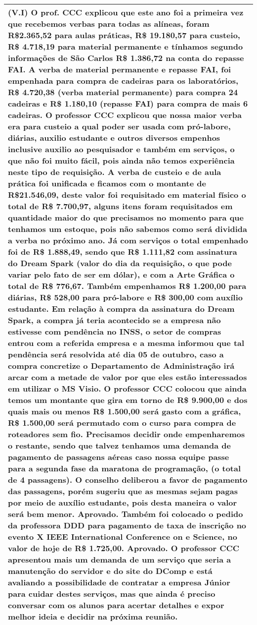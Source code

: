 \begin{longtable}{|p{17.5cm}|}
 \\ \hline 
(V.I) O prof. CCC explicou que este ano foi a primeira vez que recebemos verbas para todas as alíneas, foram R\$2.365,52 para aulas práticas, R\$ 19.180,57 para custeio, R\$ 4.718,19 para material permanente e tínhamos segundo informações de São Carlos R\$ 1.386,72 na conta do repasse FAI. A verba de material permanente e repasse FAI, foi empenhada para compra de cadeiras para os laboratórios, R\$ 4.720,38 (verba material permanente) para compra 24 cadeiras e R\$ 1.180,10 (repasse FAI) para compra de mais 6 cadeiras. O professor CCC explicou que nossa maior verba era para custeio a qual poder ser usada com pró-labore, diárias, auxilio estudante e outros diversos empenhos inclusive auxilio ao pesquisador e também em serviços, o que não foi muito fácil, pois ainda não temos experiência neste tipo de requisição. A verba de custeio e de aula prática foi unificada e ficamos com o montante de R\$21.546,09, deste valor foi requisitado em material físico o total de R\$ 7.700,97, alguns itens foram requisitados em quantidade maior do que precisamos no momento para que tenhamos um estoque, pois não sabemos como será dividida a verba no próximo ano. Já com serviços o total empenhado foi de R\$ 1.888,49, sendo que R\$ 1.111,82 com assinatura do Dream Spark (valor do dia da requisição, o que pode variar pelo fato de ser em dólar), e com a Arte Gráfica o total de R\$ 776,67. Também empenhamos R\$ 1.200,00 para diárias, R\$ 528,00 para pró-labore e R\$ 300,00 com auxílio estudante. Em relação à compra da assinatura do Dream Spark, a compra já teria acontecido se a empresa não estivesse com pendência no INSS, o setor de compras entrou com a referida empresa e a mesma informou que tal pendência será resolvida até dia 05 de outubro, caso a compra concretize o Departamento de Administração irá arcar com a metade de valor por que eles estão interessados em utilizar o MS Visio. O professor CCC colocou que ainda temos um montante que gira em torno de R\$ 9.900,00 e dos quais mais ou menos R\$ 1.500,00 será gasto com a gráfica, R\$ 1.500,00 será permutado com o curso para compra de roteadores sem fio. Precisamos decidir onde empenharemos o restante, sendo que talvez tenhamos uma demanda de pagamento de passagens aéreas caso nossa equipe passe para a segunda fase da maratona de programação, (o total de 4 passagens). O conselho deliberou a favor de pagamento das passagens, porém sugeriu que as mesmas sejam pagas por meio de auxílio estudante, pois desta maneira o valor será bem menor. Aprovado. Também foi colocado o pedido da professora DDD para pagamento de taxa de inscrição no evento X IEEE International Conference on e Science, no valor de hoje de R\$ 1.725,00. Aprovado. O professor CCC apresentou mais um demanda de um serviço que seria a manutenção do servidor e do site do DComp e está avaliando a possibilidade de contratar a empresa Júnior para cuidar destes serviços, mas que ainda é preciso conversar com os alunos para acertar detalhes e expor melhor ideia e decidir na próxima reunião.

 \\ \hline 

\end{longtable} 





